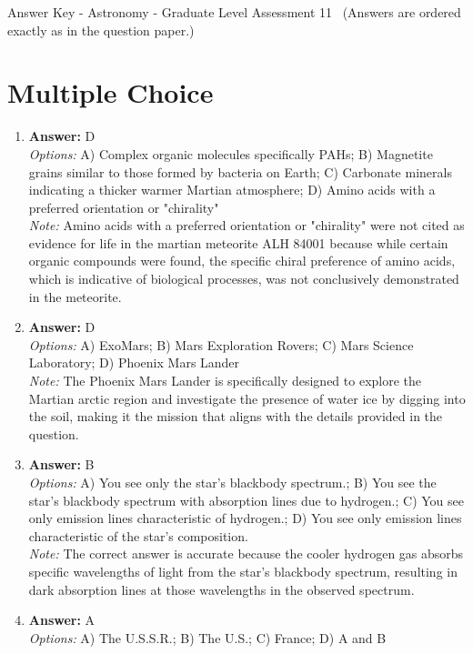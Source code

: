 \documentclass[12pt]{article}
\begin{document}
\begin{center}
Answer Key - Astronomy - Graduate Level Assessment 11 \
\small (Answers are ordered exactly as in the question paper.)
\end{center}

\section*{Multiple Choice}
\begin{enumerate}[label=\arabic*.]
\item \textbf{Answer:} D
\\ \textit{Options:} A) Complex organic molecules specifically PAHs; B) Magnetite grains similar to those formed by bacteria on Earth; C) Carbonate minerals indicating a thicker warmer Martian atmosphere; D) Amino acids with a preferred orientation or "chirality"
\\ \textit{Note:} Amino acids with a preferred orientation or "chirality" were not cited as evidence for life in the martian meteorite ALH 84001 because while certain organic compounds were found, the specific chiral preference of amino acids, which is indicative of biological processes, was not conclusively demonstrated in the meteorite.
\item \textbf{Answer:} D
\\ \textit{Options:} A) ExoMars; B) Mars Exploration Rovers; C) Mars Science Laboratory; D) Phoenix Mars Lander
\\ \textit{Note:} The Phoenix Mars Lander is specifically designed to explore the Martian arctic region and investigate the presence of water ice by digging into the soil, making it the mission that aligns with the details provided in the question.
\item \textbf{Answer:} B
\\ \textit{Options:} A) You see only the star's blackbody spectrum.; B) You see the star's blackbody spectrum with absorption lines due to hydrogen.; C) You see only emission lines characteristic of hydrogen.; D) You see only emission lines characteristic of the star's composition.
\\ \textit{Note:} The correct answer is accurate because the cooler hydrogen gas absorbs specific wavelengths of light from the star's blackbody spectrum, resulting in dark absorption lines at those wavelengths in the observed spectrum.
\item \textbf{Answer:} A
\\ \textit{Options:} A) The U.S.S.R.; B) The U.S.; C) France; D) A and B

\end{enumerate}
\end{document}
